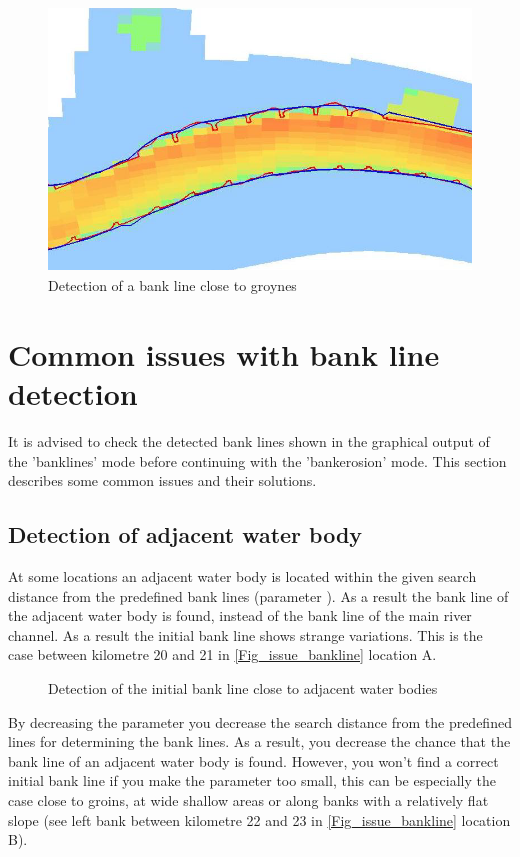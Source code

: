 \begin{figure}[!hb]
\includegraphics[width=\textwidth,height=7cm]{figures/Fig3-3.png}
\caption{Detection of a bank line close to groynes}
\label{Fig3.3}
\vspace{-0.75cm}
\end{figure}
\clearpage

\section{Common issues with bank line detection} \label{Sec:DetectIssues}
It is advised to check the detected bank lines shown in the graphical output of the 'banklines' mode before continuing with the 'bankerosion' mode.
This section describes some common issues and their solutions.

\subsection{Detection of adjacent water body}
At some locations an adjacent water body is located within the given search distance from the predefined bank lines (parameter ).
As a result the bank line of the adjacent water body is found, instead of the bank line of the main river channel.
As a result the initial bank line shows strange variations.
This is the case between kilometre 20 and 21 in \autoref{Fig_issue_bankline} location A.

\begin{figure}[!hb]
	\center
	\resizebox{15cm}{!}{
		
	}
	\caption{Detection of the initial bank line close to adjacent water bodies}
	\label{Fig_issue_bankline}
\end{figure}

By decreasing the parameter  you decrease the search distance from the predefined lines for determining the bank lines.
As a result, you decrease the chance that the bank line of an adjacent water  body is found.
However, you won't find a correct initial bank line if you make the parameter  too small, this can be especially the case close to groins, at wide shallow areas or along banks with a relatively flat slope (see left bank between kilometre 22 and 23 in \autoref{Fig_issue_bankline} location B).

